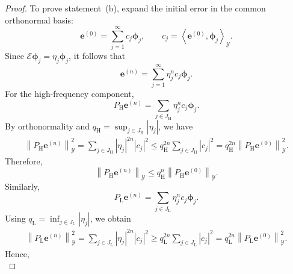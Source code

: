 \documentclass[preprint,numbers,sort&compress]{elsarticle}
\begin{document}
\begin{proof}
				To prove statement~(b), expand the initial error in the common
				orthonormal basis:
				\begin{equation*}
					\boldsymbol e^{(0)}
					=
					\sum_{j=1}^{\infty}
					c_j\boldsymbol\phi_j,
					\qquad
					c_j
					=
					\left\langle
					\boldsymbol e^{(0)},\boldsymbol\phi_j
					\right\rangle_{\mathcal Y}.
					\label{eq:error_initial_expansion}
				\end{equation*}
				Since
				$\mathcal E\boldsymbol\phi_j=\eta_j\boldsymbol\phi_j$,
				it follows that
				\begin{equation*}
					\boldsymbol e^{(n)}
					=
					\sum_{j=1}^{\infty}
					\eta_j^n c_j\boldsymbol\phi_j.
					\label{eq:error_modal_expansion}
				\end{equation*}
				For the high-frequency component,
				\[
				P_{\mathrm H}\boldsymbol e^{(n)}
				=
				\sum_{j\in J_{\mathrm H}}
				\eta_j^n c_j\boldsymbol\phi_j.
				\]
				By orthonormality and
				$q_{\mathrm H}=\sup_{j\in J_{\mathrm H}}|\eta_j|$, we have
				\[
				\begin{aligned}
					\left\|
					P_{\mathrm H}\boldsymbol e^{(n)}
					\right\|_{\mathcal Y}^2
					=
					\sum_{j\in J_{\mathrm H}}
					|\eta_j|^{2n}|c_j|^2\leq
					q_{\mathrm H}^{2n}
					\sum_{j\in J_{\mathrm H}}|c_j|^2
					=
					q_{\mathrm H}^{2n}
					\left\|
					P_{\mathrm H}\boldsymbol e^{(0)}
					\right\|_{\mathcal Y}^2.
				\end{aligned}
				\]
				Therefore,
				\begin{equation}
					\left\|
					P_{\mathrm H}\boldsymbol e^{(n)}
					\right\|_{\mathcal Y}
					\leq
					q_{\mathrm H}^n
					\left\|
					P_{\mathrm H}\boldsymbol e^{(0)}
					\right\|_{\mathcal Y}.
					\label{eq:high_frequency_decay}
				\end{equation}
				Similarly,
				\[
				P_{\mathrm L}\boldsymbol e^{(n)}
				=
				\sum_{j\in J_{\mathrm L}}
				\eta_j^n c_j\boldsymbol\phi_j.
				\]
				Using
				$q_{\mathrm L}=\inf_{j\in J_{\mathrm L}}|\eta_j|$, we obtain
				\[
				\begin{aligned}
					\left\|
					P_{\mathrm L}\boldsymbol e^{(n)}
					\right\|_{\mathcal Y}^2
					=
					\sum_{j\in J_{\mathrm L}}
					|\eta_j|^{2n}|c_j|^2
					\geq
					q_{\mathrm L}^{2n}
					\sum_{j\in J_{\mathrm L}}|c_j|^2
					=
					q_{\mathrm L}^{2n}
					\left\|
					P_{\mathrm L}\boldsymbol e^{(0)}
					\right\|_{\mathcal Y}^2.
				\end{aligned}
				\]
				Hence,
				\begin{equation}

\end{equation}
\end{proof}
\end{document}
